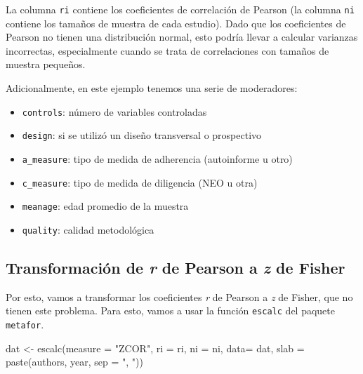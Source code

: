 \documentclass[
]{article}
\newenvironment{Shaded}{\begin{snugshade}}{\end{snugshade}}
\newcommand{\AttributeTok}[1]{\textcolor[rgb]{0.80,0.80,0.80}{#1}}
\newcommand{\FunctionTok}[1]{\textcolor[rgb]{0.94,0.94,0.56}{#1}}
\newcommand{\NormalTok}[1]{\textcolor[rgb]{0.80,0.80,0.80}{#1}}
\newcommand{\OtherTok}[1]{\textcolor[rgb]{0.94,0.94,0.56}{#1}}
\newcommand{\StringTok}[1]{\textcolor[rgb]{0.80,0.58,0.58}{#1}}
\begin{document}
La columna \texttt{ri} contiene los coeficientes de correlación de
Pearson (la columna \texttt{ni} contiene los tamaños de muestra de cada
estudio). Dado que los coeficientes de Pearson no tienen una
distribución normal, esto podría llevar a calcular varianzas
incorrectas, especialmente cuando se trata de correlaciones con tamaños
de muestra pequeños.

Adicionalmente, en este ejemplo tenemos una serie de moderadores:

\begin{itemize}
\item
  \texttt{controls}: número de variables controladas
\item
  \texttt{design}: si se utilizó un diseño transversal o prospectivo
\item
  \texttt{a\_measure}: tipo de medida de adherencia (autoinforme u otro)
\item
  \texttt{c\_measure}: tipo de medida de diligencia (NEO u otra)
\item
  \texttt{meanage}: edad promedio de la muestra
\item
  \texttt{quality}: calidad metodológica
\end{itemize}

\hypertarget{transformaciuxf3n-de-r-de-pearson-a-z-de-fisher}{%
\subsection{\texorpdfstring{Transformación de \emph{r} de Pearson a
\emph{z} de
Fisher}{Transformación de r de Pearson a z de Fisher}}\label{transformaciuxf3n-de-r-de-pearson-a-z-de-fisher}}

Por esto, vamos a transformar los coeficientes \emph{r} de Pearson a
\emph{z} de Fisher, que no tienen este problema. Para esto, vamos a usar
la función \texttt{escalc} del paquete \texttt{metafor}.

\begin{Shaded}
\begin{Highlighting}[]
\NormalTok{dat }\OtherTok{\textless{}{-}} \FunctionTok{escalc}\NormalTok{(}\AttributeTok{measure =} \StringTok{"ZCOR"}\NormalTok{, }
              \AttributeTok{ri =}\NormalTok{ ri, }
              \AttributeTok{ni =}\NormalTok{ ni,}
              \AttributeTok{data=}\NormalTok{ dat, }
              \AttributeTok{slab =} \FunctionTok{paste}\NormalTok{(authors, year, }\AttributeTok{sep =} \StringTok{", "}\NormalTok{))}
\end{Highlighting}
\end{Shaded}
\end{document}
